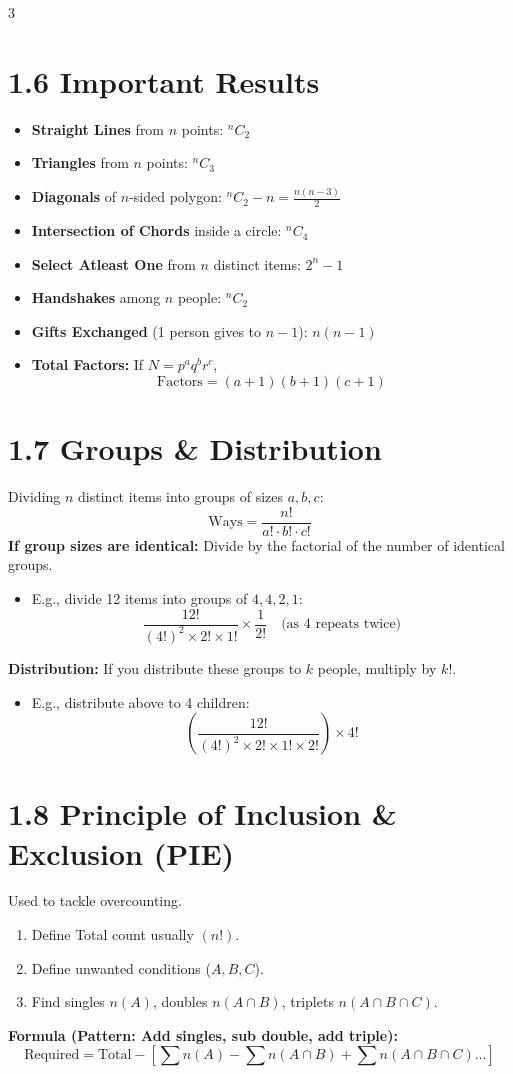 \documentclass[11pt,a4paper,landscape]{article}
\begin{document}
\begin{multicols*}{3}
\section*{1.6 Important Results}
\begin{itemize}
\item \textbf{Straight Lines} from $n$ points: ${}^nC_2$
\item \textbf{Triangles} from $n$ points: ${}^nC_3$
\item \textbf{Diagonals} of $n$-sided polygon: ${}^nC_2 - n = \frac{n(n-3)}{2}$
\item \textbf{Intersection of Chords} inside a circle: ${}^nC_4$
\item \textbf{Select Atleast One} from $n$ distinct items: $2^n - 1$
\item \textbf{Handshakes} among $n$ people: ${}^nC_2$
\item \textbf{Gifts Exchanged} (1 person gives to $n-1$): $n(n-1)$
\item \textbf{Total Factors:} If $N = p^a q^b r^c$, 
  $$\text{Factors} = (a+1)(b+1)(c+1)$$
\end{itemize}

\section*{1.7 Groups \& Distribution}
Dividing $n$ distinct items into groups of sizes $a,b,c$:
$$\text{Ways} = \frac{n!}{a! \cdot b! \cdot c!}$$
\textbf{If group sizes are identical:} Divide by the factorial of the number of identical groups.
\begin{itemize}
\item E.g., divide 12 items into groups of $4, 4, 2, 1$:
  $$ \frac{12!}{(4!)^2 \times 2! \times 1!} \times \frac{1}{2!} \quad \text{(as 4 repeats twice)}$$
\end{itemize}
\textbf{Distribution:} If you distribute these groups to $k$ people, multiply by $k!$.
\begin{itemize}
\item E.g., distribute above to 4 children:
  $$ \left( \frac{12!}{(4!)^2 \times 2! \times 1! \times 2!} \right) \times 4! $$
\end{itemize}

\section*{1.8 Principle of Inclusion \& Exclusion (PIE)}
Used to tackle overcounting.
\begin{enumerate}
\item Define Total count usually $(n!)$.
\item Define unwanted conditions ($A, B, C$).
\item Find singles $n(A)$, doubles $n(A \cap B)$, triplets $n(A \cap B \cap C)$.
\end{enumerate}
\textbf{Formula (Pattern: Add singles, sub double, add triple):}
$$\text{Required} = \text{Total} - [\sum n(A) - \sum n(A \cap B) + \sum n(A \cap B \cap C) \dots ]$$


\end{multicols*}
\end{document}
